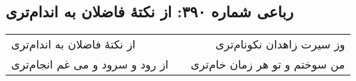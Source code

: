 \begin{center}
\section*{رباعی شماره ۳۹۰: از نکتهٔ فاضلان به اندام‌تری}
\label{sec:sh390}
\begin{longtable}{l p{0.5cm} r}
از نکتهٔ فاضلان به اندام‌تری
&&
وز سیرت زاهدان نکونام‌تری
\\
از رود و سرود و می غم انجام‌تری
&&
من سوختم و تو هر زمان خام‌تری
\\
\end{longtable}
\end{center}
